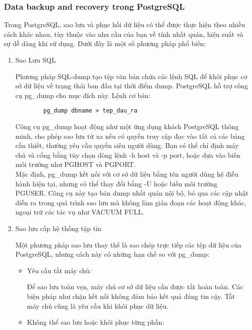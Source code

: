 \subsubsection{Data backup and recovery trong PostgreSQL}
\indent Trong PostgreSQL, sao lưu và phục hồi dữ liệu có thể được thực hiện theo nhiều cách khác nhau, tùy thuộc vào nhu cầu của bạn về tính nhất quán, hiệu suất và sự dễ dàng khi sử dụng. Dưới đây là một số phương pháp phổ biến:
\begin{enumerate}
    \item Sao Lưu SQL

    \hspace{1cm} Phương pháp SQL-dump tạo tệp văn bản chứa các lệnh SQL để khôi phục cơ sở dữ liệu về trạng thái ban đầu tại thời điểm dump. PostgreSQL hỗ trợ công cụ pg\_dump cho mục đích này. Lệnh cơ bản:
    \begin{lstlisting}
        pg_dump dbname > tep_dau_ra
    \end{lstlisting}
    
    \hspace{1cm} Công cụ pg\_dump hoạt động như một ứng dụng khách PostgreSQL thông minh, cho phép sao lưu từ xa nếu có quyền truy cập đọc vào tất cả các bảng cần thiết, thường yêu cầu quyền siêu người dùng. Bạn có thể chỉ định máy chủ và cổng bằng tùy chọn dòng lệnh -h host và -p port, hoặc dựa vào biến môi trường như PGHOST và PGPORT.\\

    \hspace{1cm} Mặc định, pg\_dump kết nối với cơ sở dữ liệu bằng tên người dùng hệ điều hành hiện tại, nhưng có thể thay đổi bằng -U hoặc biến môi trường PGUSER. Công cụ này tạo bản dump nhất quán nội bộ, bỏ qua các cập nhật diễn ra trong quá trình sao lưu mà không làm gián đoạn các hoạt động khác, ngoại trừ các tác vụ như VACUUM FULL.
    \item Sao lưu cấp hệ thống tập tin

    \hspace{1cm}Một phương pháp sao lưu thay thế là sao chép trực tiếp các tệp dữ liệu của PostgreSQL, nhưng cách này có những hạn chế so với pg\_dump:
    \begin{itemize}
        \item Yêu cầu tắt máy chủ:

        \hspace{1cm}Để sao lưu toàn vẹn, máy chủ cơ sở dữ liệu cần được tắt hoàn toàn. Các biện pháp như chặn kết nối không đảm bảo kết quả đáng tin cậy. Tắt máy chủ cũng là yêu cầu khi khôi phục dữ liệu.
        \item Không thể sao lưu hoặc khôi phục từng phần:


\end{itemize}
\end{enumerate}
